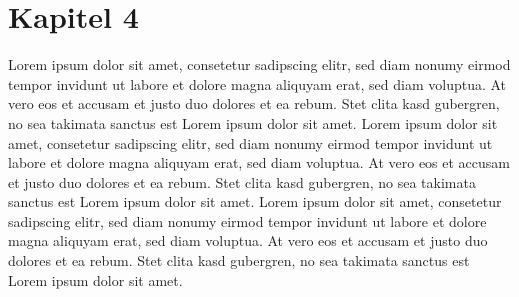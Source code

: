 \chapter{Kapitel 4}
\label{chap:four}
Lorem ipsum dolor sit amet, consetetur sadipscing elitr, sed diam nonumy eirmod tempor invidunt ut labore et dolore magna aliquyam erat, sed diam voluptua. At vero eos et accusam et justo duo dolores et ea rebum. Stet clita kasd gubergren, no sea takimata sanctus est Lorem ipsum dolor sit amet. Lorem ipsum dolor sit amet, consetetur sadipscing elitr, sed diam nonumy eirmod tempor invidunt ut labore et dolore magna aliquyam erat, sed diam voluptua. At vero eos et accusam et justo duo dolores et ea rebum. Stet clita kasd gubergren, no sea takimata sanctus est Lorem ipsum dolor sit amet. Lorem ipsum dolor sit amet, consetetur sadipscing elitr, sed diam nonumy eirmod tempor invidunt ut labore et dolore magna aliquyam erat, sed diam voluptua. At vero eos et accusam et justo duo dolores et ea rebum. Stet clita kasd gubergren, no sea takimata sanctus est Lorem ipsum dolor sit amet.
\endinput 